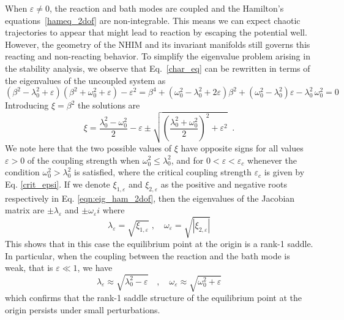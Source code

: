 \documentclass{ws-ijbc}
\begin{document}
When $\varepsilon \neq 0$, the reaction and bath modes are coupled and the Hamilton's equations~\eqref{hameq_2dof} are non-integrable. This means we can expect chaotic trajectories to appear that might lead to reaction by escaping the potential well. However, the geometry of the NHIM and its invariant manifolds still governs this reacting and non-reacting behavior. To simplify the eigenvalue problem arising in the stability analysis, we observe that Eq.~\eqref{char_eq} can be rewritten in terms of the eigenvalues of the uncoupled system as
\begin{equation}
\left(\beta^2 - \lambda_0^2 + \varepsilon\right) \left(\beta^2 + \omega_0^2 + \varepsilon\right) - \varepsilon^2 = \beta^4 + \left(\omega_0^2 - \lambda_0^2 + 2\varepsilon\right) \beta^2 + \left( \omega_0^2 - \lambda_0^2\right)\varepsilon - \lambda_0^2 \, \omega_0^2 = 0
\end{equation}
Introducing $\xi = \beta^2$ the solutions are
\begin{equation}
\xi =\dfrac{\lambda_0^2 - \omega_0^2}{2} - \varepsilon \pm \sqrt{\left(\dfrac{\lambda_0^2 + \omega_0^2}{2}\right)^2 + \varepsilon^2} \;\;.
\label{eqn:eig_ham_2dof}
\end{equation}
We note here that the two possible values of $\xi$ have opposite signs for all values $\varepsilon > 0$ of the coupling strength when $\omega_0^2 \leq \lambda_0^2$, and for $0 < \varepsilon < \varepsilon_c$ whenever the condition $\omega_0^2 > \lambda_0^2$ is satisfied, where the critical coupling strength $\varepsilon_c$ is given by Eq. \eqref{crit_epsi}. If we denote $\xi_{1,\varepsilon}$ and $\xi_{2,\varepsilon}$ as the positive and negative roots respectively in Eq. \eqref{eqn:eig_ham_2dof}, then the eigenvalues of the Jacobian matrix are $\pm \lambda_\varepsilon$ and $\pm \omega_\varepsilon i$ where
\begin{equation}
\lambda_\varepsilon = \sqrt{\xi_{1,\varepsilon}} \;,\quad \omega_\varepsilon = \sqrt{|\xi_{2,\varepsilon}|}
\label{eigenvalues_2dof}
\end{equation}
This shows that in this case the equilibrium point at the origin is a rank-1 saddle. In particular, when the coupling between the reaction and the bath mode is weak, that is $\varepsilon \ll 1$, we have 
\begin{equation}
\lambda_\varepsilon \approx \sqrt{\lambda_0^2 - \varepsilon} \quad,\quad \omega_\varepsilon \approx \sqrt{\omega_0^2 + \varepsilon}
\end{equation}
which confirms that the rank-1 saddle structure of the equilibrium point at the origin persists under small perturbations. 
\end{document}
